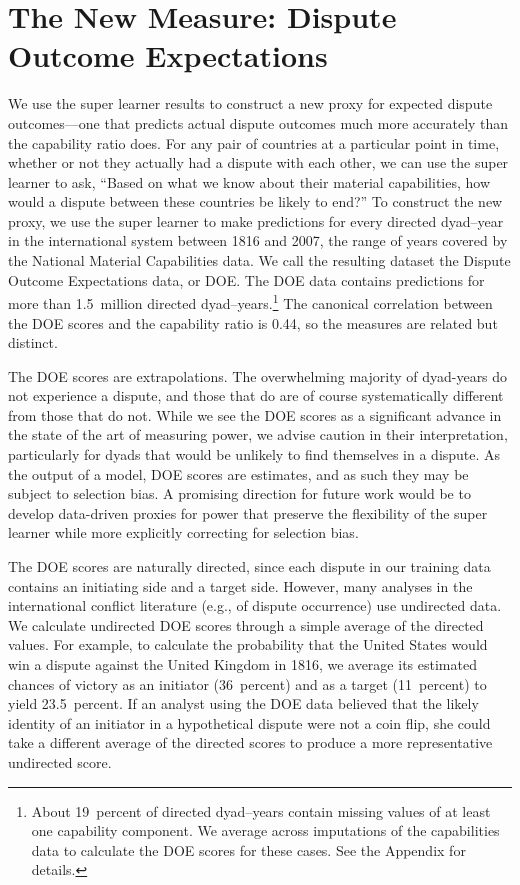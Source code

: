 
\section{The New Measure: Dispute Outcome Expectations}
\label{sec:scores}

We use the super learner results to construct a new proxy for expected dispute outcomes---one that predicts actual dispute outcomes much more accurately than the capability ratio does.
For any pair of countries at a particular point in time, whether or not they actually had a dispute with each other, we can use the super learner to ask, ``Based on what we know about their material capabilities, how would a dispute between these countries be likely to end?''
To construct the new proxy, we use the super learner to make predictions for every directed dyad--year in the international system between 1816 and 2007, the range of years covered by the National Material Capabilities data.
We call the resulting dataset the Dispute Outcome Expectations data, or DOE.
The DOE data contains predictions for more than 1.5~million directed dyad--years.\footnote{%
  About 19~percent of directed dyad--years contain missing values of at least one capability component.
  We average across imputations of the capabilities data to calculate the DOE scores for these cases.
  See the Appendix for details.
}
The canonical correlation between the DOE scores and the capability ratio is 0.44, so the measures are related but distinct.

The DOE scores are extrapolations.
The overwhelming majority of dyad-years do not experience a dispute, and those that do are of course systematically different from those that do not.
While we see the DOE scores as a significant advance in the state of the art of measuring power, we advise caution in their interpretation, particularly for dyads that would be unlikely to find themselves in a dispute.
As the output of a model, DOE scores are estimates, and as such they may be subject to selection bias.
A promising direction for future work would be to develop data-driven proxies for power that preserve the flexibility of the super learner while more explicitly correcting for selection bias.

The DOE scores are naturally directed, since each dispute in our training data contains an initiating side and a target side.
However, many analyses in the international conflict literature (e.g., of dispute occurrence) use undirected data.
We calculate undirected DOE scores through a simple average of the directed values.
For example, to calculate the probability that the United States would win a dispute against the United Kingdom in 1816, we average its estimated chances of victory as an initiator (36~percent) and as a target (11~percent) to yield 23.5~percent.
If an analyst using the DOE data believed that the likely identity of an initiator in a hypothetical dispute were not a coin flip, she could take a different average of the directed scores to produce a more representative undirected score.

